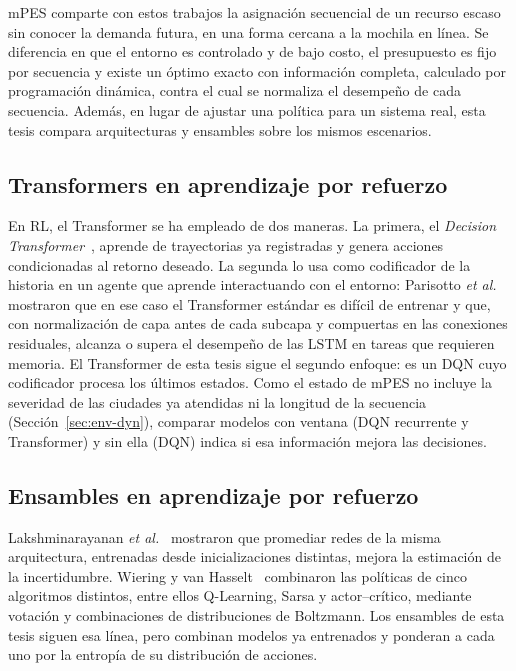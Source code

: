 \documentclass[../00_Main/Main.tex]{subfiles}
\begin{document}
mPES comparte con estos trabajos la asignaci\'on secuencial de un recurso
escaso sin conocer la demanda futura, en una forma cercana a la mochila en
l\'inea. Se diferencia en que el entorno es controlado y de bajo
costo, el presupuesto es fijo por secuencia y existe un \'optimo exacto con
informaci\'on completa, calculado por programaci\'on din\'amica, contra el
cual se normaliza el desempe\~no de cada secuencia. Adem\'as, en lugar de ajustar una
pol\'itica para un sistema real, esta tesis compara arquitecturas y ensambles sobre
los mismos escenarios.

\subsection{Transformers en aprendizaje por refuerzo}\label{sec:soa-trf}

En RL, el Transformer se ha empleado de dos maneras. La primera, el
\emph{Decision Transformer}~\citep{Chen2021}, aprende de trayectorias ya registradas y
genera acciones condicionadas al retorno deseado. La segunda lo usa
como codificador de la historia en un agente que aprende interactuando
con el entorno: Parisotto \emph{et al.}~\citep{Parisotto2020} mostraron
que en ese caso el Transformer est\'andar es dif\'icil de entrenar y que,
con normalizaci\'on de capa antes de cada subcapa y compuertas en las
conexiones residuales, alcanza o supera el desempe\~no de las LSTM en
tareas que requieren memoria. El Transformer de esta tesis sigue el segundo enfoque: es un DQN
cuyo codificador procesa los \'ultimos estados. Como el estado de mPES no
incluye la severidad de las ciudades ya atendidas ni la longitud de la
secuencia (Secci\'on~\ref{sec:env-dyn}), comparar modelos con ventana
(DQN recurrente y Transformer) y sin ella (DQN) indica si esa
informaci\'on mejora las decisiones.

\subsection{Ensambles en aprendizaje por refuerzo}

Lakshminarayanan \emph{et al.}~\citep{Lakshminarayanan2017} mostraron
que promediar redes de la misma arquitectura, entrenadas desde
inicializaciones distintas, mejora la estimaci\'on de la incertidumbre.
Wiering y van Hasselt~\citep{Wiering2008} combinaron las pol\'iticas de
cinco algoritmos distintos, entre ellos Q-Learning, Sarsa y
actor--cr\'itico, mediante votaci\'on y combinaciones de distribuciones de
Boltzmann. Los ensambles de esta
tesis siguen esa l\'inea, pero combinan modelos ya entrenados y ponderan
a cada uno por la entrop\'ia de su distribuci\'on de acciones.
\end{document}
